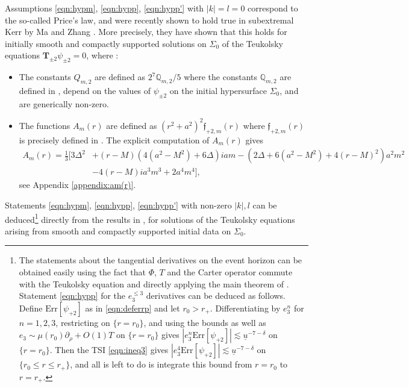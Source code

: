 \documentclass[reqno]{amsart}
\numberwithin{equation}{section}
\newcommand{\ubar}{{\underline{u}}}
\newcommand{\errp}{\mathrm{Err}[\Psip]}
\newcommand{\teuk}{\mathbf{T}}
\newcommand{\Psip}{\psi_{+2}}
\theoremstyle{plain}
\theoremstyle{definition}
\theoremstyle{remark}
\numberwithin{equation}{section}
\begin{document}
\begin{rem}
Assumptions \eqref{eqn:hypm}, \eqref{eqn:hypp}, \eqref{eqn:hypp'} with $|k|=l=0$ correspond to the so-called Price's law, and were recently shown to hold true in subextremal Kerr by Ma and Zhang \cite{pricelaw}. More precisely, they have shown that this holds for initially smooth and compactly supported solutions on $\Sigma_0$ of the Teukolsky equations $\teuk_{\pm 2}\psi_{\pm 2}=0$, where :
\begin{itemize}
    \item  The constants $Q_{m,2}$ are defined as $2^7\mathbb{Q}_{m,2}/5$ where the constants $\mathbb{Q}_{m,2}$ are  defined in \cite[Lemma 5.7]{pricelaw}, depend on the values of $\psi_{\pm 2}$ on the initial hypersurface $\Sigma_{0}$, and are generically non-zero.
    \item The functions $A_m(r)$ are defined as $(r^2+a^2)^2\mathfrak{f}_{+2,m}(r)$ where $\mathfrak{f}_{+2,m}(r)$ is precisely defined in \cite[Eq. (5.82c)]{pricelaw}. The explicit computation of $A_m(r)$ gives
    \begin{align*}
    A_m(r)=\frac{1}{3}\Big[3\Delta^2&+(r-M)(4(a^2-M^2)+6\Delta)iam-(2\Delta+6(a^2-M^2)+4(r-M)^2)a^2m^2\nonumber\\
    &-4(r-M)ia^3m^3+2a^4m^4\Big],
\end{align*} 
see Appendix \ref{appendix:am(r)}.
\end{itemize}
    Statements \eqref{eqn:hypm}, \eqref{eqn:hypp}, \eqref{eqn:hypp'} with non-zero $|k|,l$ can be deduced\footnote{The statements about the tangential derivatives on the event horizon can be obtained easily using the fact that $\Phi$, $T$ and the Carter operator commute with the Teukolsky equation and directly applying the main theorem of \cite{pricelaw}. Statement \eqref{eqn:hypp} for the $e_3^{\leq 3}$ derivatives can be deduced as follows. Define $\errp$ as in \eqref{eqn:deferrp} and let $r_0>r_+$. Differentiating \cite[Eq. (5.87)]{pricelaw} by $e_3^n$ for $n=1,2,3$, restricting on $\{r=r_0\}$, and using the bounds \cite[Eq. (4.101), (4.99)]{pricelaw} as well as $e_3\sim \mu(r_0)\partial_\rho+O(1)T$ on $\{r=r_0\}$ gives $|e_3^{n}\errp|\lesssim\ubar^{-7-\delta}$ on $\{r=r_0\}$. Then the TSI \eqref{eqn:ineq3} gives $|e_3^4\errp|\lesssim\ubar^{-7-\delta}$ on $\{r_0\leq r\leq r_+\}$, and all is left to do is integrate this bound from $r=r_0$ to $r=r_+$.} directly from the results in \cite{pricelaw}, for solutions of the Teukolsky equations arising from smooth and compactly supported initial data on $\Sigma_0$.
\end{rem}
\end{document}
